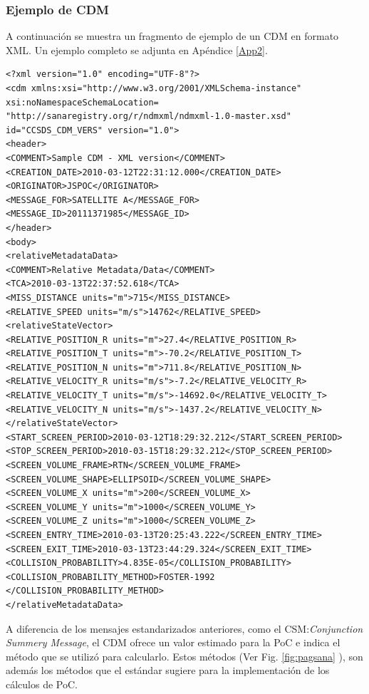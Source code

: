 {\begin{center}
\end{center}


\subsubsection*{Ejemplo de CDM}
A continuaci\'on se muestra un fragmento de ejemplo de un CDM en formato XML. Un ejemplo completo se adjunta en Ap\'endice \ref{App2}.\\

\lstset{language=XML,basicstyle=\small}
\begin{lstlisting}
<?xml version="1.0" encoding="UTF-8"?>
<cdm xmlns:xsi="http://www.w3.org/2001/XMLSchema-instance"
xsi:noNamespaceSchemaLocation=
"http://sanaregistry.org/r/ndmxml/ndmxml-1.0-master.xsd"
id="CCSDS_CDM_VERS" version="1.0">
<header>
<COMMENT>Sample CDM - XML version</COMMENT>
<CREATION_DATE>2010-03-12T22:31:12.000</CREATION_DATE>
<ORIGINATOR>JSPOC</ORIGINATOR>
<MESSAGE_FOR>SATELLITE A</MESSAGE_FOR>
<MESSAGE_ID>20111371985</MESSAGE_ID>
</header>
<body>
<relativeMetadataData>
<COMMENT>Relative Metadata/Data</COMMENT>
<TCA>2010-03-13T22:37:52.618</TCA>
<MISS_DISTANCE units="m">715</MISS_DISTANCE>
<RELATIVE_SPEED units="m/s">14762</RELATIVE_SPEED>
<relativeStateVector>
<RELATIVE_POSITION_R units="m">27.4</RELATIVE_POSITION_R>
<RELATIVE_POSITION_T units="m">-70.2</RELATIVE_POSITION_T>
<RELATIVE_POSITION_N units="m">711.8</RELATIVE_POSITION_N>
<RELATIVE_VELOCITY_R units="m/s">-7.2</RELATIVE_VELOCITY_R>
<RELATIVE_VELOCITY_T units="m/s">-14692.0</RELATIVE_VELOCITY_T>
<RELATIVE_VELOCITY_N units="m/s">-1437.2</RELATIVE_VELOCITY_N>
</relativeStateVector>
<START_SCREEN_PERIOD>2010-03-12T18:29:32.212</START_SCREEN_PERIOD>
<STOP_SCREEN_PERIOD>2010-03-15T18:29:32.212</STOP_SCREEN_PERIOD>
<SCREEN_VOLUME_FRAME>RTN</SCREEN_VOLUME_FRAME>
<SCREEN_VOLUME_SHAPE>ELLIPSOID</SCREEN_VOLUME_SHAPE>
<SCREEN_VOLUME_X units="m">200</SCREEN_VOLUME_X>
<SCREEN_VOLUME_Y units="m">1000</SCREEN_VOLUME_Y>
<SCREEN_VOLUME_Z units="m">1000</SCREEN_VOLUME_Z>
<SCREEN_ENTRY_TIME>2010-03-13T20:25:43.222</SCREEN_ENTRY_TIME>
<SCREEN_EXIT_TIME>2010-03-13T23:44:29.324</SCREEN_EXIT_TIME>
<COLLISION_PROBABILITY>4.835E-05</COLLISION_PROBABILITY>
<COLLISION_PROBABILITY_METHOD>FOSTER-1992
</COLLISION_PROBABILITY_METHOD>
</relativeMetadataData>
\end{lstlisting}

A diferencia de los mensajes estandarizados anteriores, como el CSM:{\it{Conjunction Summery Message}}, el CDM ofrece un valor estimado para la PoC e indica el m\'etodo que se utiliz\'o para calcularlo. Estos m\'etodos (Ver Fig. \ref{fig:pagsana} ), son adem\'as los m\'etodos que el est\'andar sugiere para la implementaci\'on de los c\'alculos de PoC.\\

}
